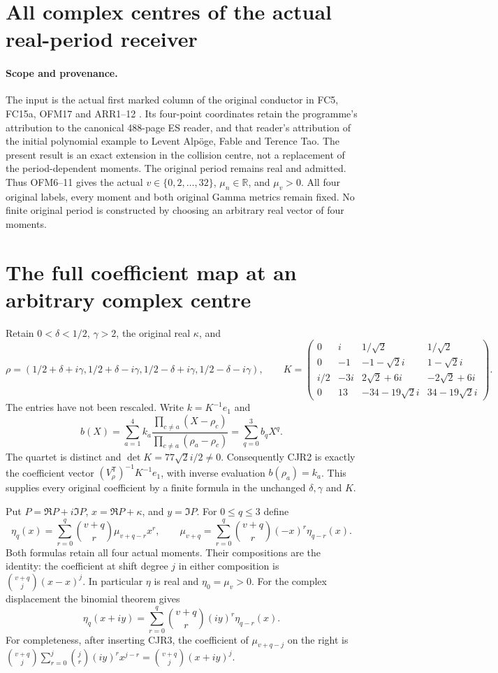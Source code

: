 \section{All complex centres of the actual real-period receiver}


\paragraph{Scope and provenance.}
The input is the actual first marked column of the original conductor
in FC5, FC15a, OFM17 and ARR1--12 \cite{ES488,WCF}. Its four-point
coordinates retain the programme's attribution to the canonical
488-page ES reader, and that reader's attribution of the initial
polynomial example to Levent Alp\"oge, Fable and Terence Tao.
The present result is an exact extension in the collision centre,
not a replacement of the period-dependent moments. The original
period remains real and admitted. Thus OFM6--11 gives the actual
$v\in\{0,2,\ldots,32\}$, $\mu_n\in\mathbb R$, and $\mu_v>0$.
All four original labels, every moment and both original Gamma
metrics remain fixed. No finite original period is constructed
by choosing an arbitrary real vector of four moments.

\section{The full coefficient map at an arbitrary complex centre}
Retain $0<\delta<1/2$, $\gamma>2$, the original real $\kappa$, and
\[
 \rho=(1/2+\delta+i\gamma,1/2+\delta-i\gamma,
       1/2-\delta+i\gamma,1/2-\delta-i\gamma),\qquad
 K=\begin{pmatrix}
 0&i&1/\sqrt2&1/\sqrt2\\
 0&-1&-1-\sqrt2i&1-\sqrt2i\\
 i/2&-3i&2\sqrt2+6i&-2\sqrt2+6i\\
 0&13&-34-19\sqrt2i&34-19\sqrt2i
 \end{pmatrix}.
 \tag{CJR1}
\]
The entries have not been rescaled. Write $k=K^{-1}e_1$ and
\[
 b(X)=\sum_{a=1}^4k_a
 \frac{\prod_{c\ne a}(X-\rho_c)}{\prod_{c\ne a}(\rho_a-\rho_c)}
 =\sum_{q=0}^3b_qX^q.
 \tag{CJR2}
\]
The quartet is distinct and $\det K=77\sqrt2i/2\ne0$.
Consequently CJR2 is exactly the coefficient vector
$(V_\rho^{\mathsf T})^{-1}K^{-1}e_1$, with inverse evaluation
$b(\rho_a)=k_a$. This supplies every original coefficient by a
finite formula in the unchanged $\delta,\gamma$ and $K$.

Put $P=\Re P+i\Im P$, $x=\Re P+\kappa$, and $y=\Im P$.
For $0\le q\le3$ define
\[
 \eta_q(x)=\sum_{r=0}^q\binom{v+q}{r}\mu_{v+q-r}x^r,
 \qquad
 \mu_{v+q}=\sum_{r=0}^q\binom{v+q}{r}(-x)^r\eta_{q-r}(x).
 \tag{CJR3}
\]
Both formulas retain all four actual moments. Their compositions
are the identity: the coefficient at shift degree $j$ in either
composition is $\binom{v+q}{j}(x-x)^j$. In particular $\eta$ is
real and $\eta_0=\mu_v>0$.
For the complex displacement the binomial theorem gives
\[
 \eta_q(x+iy)=\sum_{r=0}^q\binom{v+q}{r}(iy)^r\eta_{q-r}(x).
 \tag{CJR4}
\]
For completeness, after inserting CJR3, the coefficient of
$\mu_{v+q-j}$ on the right is
$\binom{v+q}{j}\sum_{r=0}^j\binom jr(iy)^rx^{j-r}
=\binom{v+q}{j}(x+iy)^j$.


